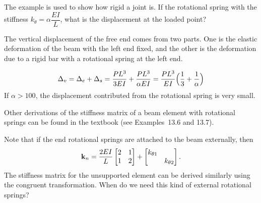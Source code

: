\begin{example}
The example is used to show how rigid a joint is. If the rotational spring with the stiffness $k_\theta = \alpha\dfrac{EI}{L}$, what is the displacement at the loaded point?
\begin{fig}
  
\end{fig}
The vertical displacement of the free end comes from two parts. One is the elastic deformation of the beam with the left end fixed, and the other is the deformation due to a rigid bar with a rotational spring at the left end.
\begin{fig}
  
\end{fig}
\begin{equation*}
  \Delta_v = \Delta_e + \Delta_s = \frac{PL^3}{3EI} + \frac{PL^3}{\alpha EI} = \frac{PL^3}{EI}\Bigl(\frac13 + \frac1\alpha\Bigr)
\end{equation*}
If $\alpha > 100$, the displacement contributed from the rotational spring is very small.

Other derivations of the stiffness matrix of a beam element with rotational springs can be found in the textbook (see Examples~13.6 and 13.7).

Note that if the end rotational springs are attached to the beam externally, then
\begin{equation*}
  \mathbf{k}_n = \frac{2EI}{L}\begin{bmatrix}2 & 1\\ 1 & 2\end{bmatrix} + \begin{bmatrix}k_{\theta1} & \\ & k_{\theta2}\end{bmatrix}.
\end{equation*}
The stiffness matrix for the unsupported element can be derived similarly using the congruent transformation. When do we need this kind of external rotational springs?
\begin{fig}
  
\end{fig}
\end{example}

